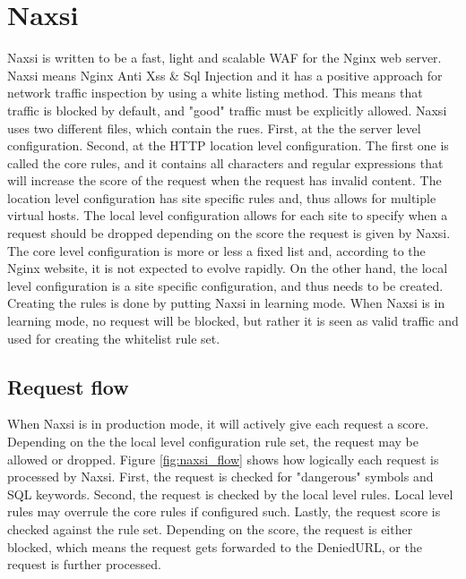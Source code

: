 \documentclass[Naxsi]{subfiles}
\begin{document}
\section{Naxsi}
\label{sec:Naxsi}
Naxsi is written to be a fast, light and scalable \ac{WAF} for the Nginx web server. Naxsi means Nginx Anti Xss \& Sql Injection and it has a positive approach for network traffic inspection by using a white listing method. This means that traffic is blocked by default, and "good" traffic must be explicitly allowed. Naxsi uses two different files, which contain the rues. First, at the the server level configuration. Second, at the HTTP location level configuration. The first one is called the core rules, and it contains all characters and regular expressions that will increase the score of the request when the request has invalid content. The location level configuration has site specific rules and, thus allows for multiple virtual hosts. The local level configuration allows for each site to specify when a request should be dropped depending on the score the request is given by Naxsi.
The core level configuration is more or less a fixed list and, according to the Nginx website, it is not expected to evolve rapidly. On the other hand, the local level configuration is a site specific configuration, and thus needs to be created. Creating the rules is done by putting Naxsi in learning mode. When Naxsi is in learning mode, no request will be blocked, but rather it is seen as valid traffic and used for creating the whitelist rule set.

\subsection{Request flow}
When Naxsi is in production mode, it will actively give each request a score. Depending on the the local level configuration rule set, the request may be allowed or dropped. Figure \ref{fig:naxsi_flow} shows how logically each request is processed by Naxsi. First, the request is checked for "dangerous" symbols and SQL keywords. Second, the request is checked by the local level rules. Local level rules may overrule the core rules if configured such. Lastly, the request score is checked against the rule set. Depending on the score, the request is either blocked, which means the request gets forwarded to the DeniedURL, or the request is further processed.
\end{document}
